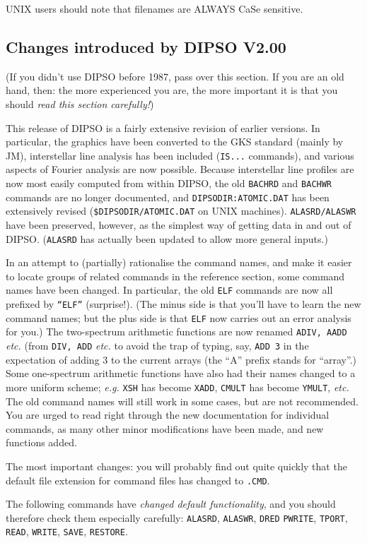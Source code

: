 \documentclass[twoside,11pt]{article}
\newcommand{\htmlref}[2]{#1}
\renewcommand{\_}{\texttt{\symbol{95}}}
\begin{document}
UNIX users should note that filenames are ALWAYS CaSe sensitive.

\subsection{ Changes introduced by DIPSO V2.00}

(If you didn't use DIPSO before 1987, pass over this section. If you
are an old hand, then: the more experienced you are, the more
important it is that you should {\em read this section carefully!})

This release of DIPSO is a fairly extensive revision of earlier
versions. In particular, the graphics have been converted to the GKS
standard (mainly by JM), interstellar line analysis has been included
({\tt{IS...}}  commands), and various aspects of Fourier analysis are
now possible. Because interstellar line profiles are now most easily
computed from within DIPSO, the old {\tt{BACHRD}}  and {\tt{BACHWR}} 
commands are no longer documented, and {\tt{DIPSODIR:ATOMIC.DAT}}  has
been extensively revised ({\tt{\$DIPSODIR/ATOMIC.DAT}}  on UNIX
machines). {\tt{ALASRD/ALASWR}}  have been preserved, however, as the
simplest way of getting data in and out of DIPSO. (\htmlref{{\tt{ALASRD}}}{COM:ALASRD}  has
actually been updated to allow more general inputs.)

In an attempt to (partially) rationalise the command names, and make it
easier to locate groups of related commands in the reference section,
some command names have been changed. In particular, the old {\tt{ELF}} 
commands are now all prefixed by {\tt{``ELF''}}  (surprise!). (The minus
side is that you'll have to learn the new command names; but the plus
side is that {\tt{ELF}}  now carries out an error analysis for you.) The
two-spectrum arithmetic functions are now renamed {\tt{ADIV,}  \htmlref{{\tt{AADD}}}{COM:AADD}}  {\em
etc.} (from {\tt{DIV,}  ADD} {\em etc.} to avoid the trap of typing, say,
{\tt{ADD~3}}  in the expectation of adding 3 to the current arrays (the
``A'' prefix stands for ``array''.) Some one-spectrum arithmetic
functions have also had their names changed to a more uniform scheme;
{\em e.g.} {\tt{XSH}}  has become \htmlref{{\tt{XADD}}}{COM:XADD},  {\tt{CMULT}}  has become
\htmlref{{\tt{YMULT}}}{COM:YMULT},  {\em etc.} The old command names will still work in some cases,
but are not recommended. You are urged to read right through the new
documentation for individual commands, as many other minor modifications
have been made, and new functions added.

The most important changes: you will probably find out quite quickly
that the default file extension for command files has changed to
{\tt{.CMD}}. 

The following commands have {\em changed default functionality}, and
you should therefore check them especially carefully: \htmlref{{\tt{ALASRD}}}{COM:ALASRD}, 
\htmlref{{\tt{ALASWR}}}{COM:ALASWR},  \htmlref{{\tt{DRED}}}{COM:DRED}  \htmlref{{\tt{PWRITE}}}{COM:PWRITE},  \htmlref{{\tt{TPORT}}}{COM:TPORT},  \htmlref{{\tt{READ}}}{COM:READ}, 
\htmlref{{\tt{WRITE}}}{COM:WRITE},  \htmlref{{\tt{SAVE}}}{COM:SAVE},  \htmlref{{\tt{RESTORE}}}{COM:RESTORE}. 
\end{document}
